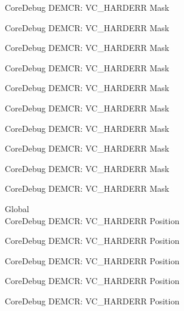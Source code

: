 \begin{DoxyRefList}
\label{deprecated__deprecated000507}%
%
Core\+Debug DEMCR\+: VC\+\_\+\+HARDERR Mask 

\label{deprecated__deprecated000609}%
%
Core\+Debug DEMCR\+: VC\+\_\+\+HARDERR Mask 

\label{deprecated__deprecated000734}%
%
Core\+Debug DEMCR\+: VC\+\_\+\+HARDERR Mask 

\label{deprecated__deprecated000814}%
%
Core\+Debug DEMCR\+: VC\+\_\+\+HARDERR Mask 

\label{deprecated__deprecated000878}%
%
Core\+Debug DEMCR\+: VC\+\_\+\+HARDERR Mask 

\label{deprecated__deprecated000953}%
%
Core\+Debug DEMCR\+: VC\+\_\+\+HARDERR Mask 

\label{deprecated__deprecated001020}%
%
Core\+Debug DEMCR\+: VC\+\_\+\+HARDERR Mask 

\label{deprecated__deprecated001096}%
%
Core\+Debug DEMCR\+: VC\+\_\+\+HARDERR Mask 

\label{deprecated__deprecated001185}%
%
Core\+Debug DEMCR\+: VC\+\_\+\+HARDERR Mask 

\label{deprecated__deprecated001287}%
%
Core\+Debug DEMCR\+: VC\+\_\+\+HARDERR Mask  
\item[Global \doxylink{group___c_m_s_i_s___core_debug_gaed9f42053031a9a30cd8054623304c0a}{Core\+Debug\+\_\+\+DEMCR\+\_\+\+VC\+\_\+\+HARDERR\+\_\+\+Pos} ]\hfill \\
\label{deprecated__deprecated000055}%
%
Core\+Debug DEMCR\+: VC\+\_\+\+HARDERR Position 

\label{deprecated__deprecated000135}%
%
Core\+Debug DEMCR\+: VC\+\_\+\+HARDERR Position 

\label{deprecated__deprecated000199}%
%
Core\+Debug DEMCR\+: VC\+\_\+\+HARDERR Position 

\label{deprecated__deprecated000274}%
%
Core\+Debug DEMCR\+: VC\+\_\+\+HARDERR Position 

\label{deprecated__deprecated000341}%
%
Core\+Debug DEMCR\+: VC\+\_\+\+HARDERR Position 


\end{DoxyRefList}
